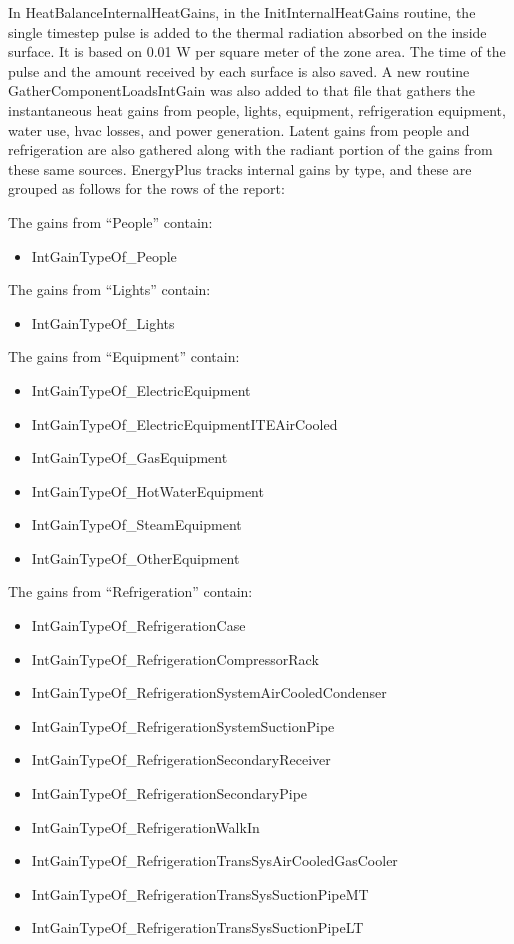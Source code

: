In HeatBalanceInternalHeatGains, in the InitInternalHeatGains routine, the single timestep pulse is added to the thermal radiation absorbed on the inside surface. It is based on 0.01 W per square meter of the zone area. The time of the pulse and the amount received by each surface is also saved. A new routine GatherComponentLoadsIntGain was also added to that file that gathers the instantaneous heat gains from people, lights, equipment, refrigeration equipment, water use, hvac losses, and power generation. Latent gains from people and refrigeration are also gathered along with the radiant portion of the gains from these same sources. EnergyPlus tracks internal gains by type, and these are grouped as follows for the rows of the report:

The gains from ``People'' contain:

\begin{itemize}
\tightlist
\item
  IntGainTypeOf\_People
\end{itemize}

The gains from ``Lights'' contain:

\begin{itemize}
\tightlist
\item
  IntGainTypeOf\_Lights
\end{itemize}

The gains from ``Equipment'' contain:

\begin{itemize}
\item
  IntGainTypeOf\_ElectricEquipment
\item
  IntGainTypeOf\_ElectricEquipmentITEAirCooled
\item
  IntGainTypeOf\_GasEquipment
\item
  IntGainTypeOf\_HotWaterEquipment
\item
  IntGainTypeOf\_SteamEquipment
\item
  IntGainTypeOf\_OtherEquipment
\end{itemize}

The gains from ``Refrigeration'' contain:

\begin{itemize}
\item
  IntGainTypeOf\_RefrigerationCase
\item
  IntGainTypeOf\_RefrigerationCompressorRack
\item
  IntGainTypeOf\_RefrigerationSystemAirCooledCondenser
\item
  IntGainTypeOf\_RefrigerationSystemSuctionPipe
\item
  IntGainTypeOf\_RefrigerationSecondaryReceiver
\item
  IntGainTypeOf\_RefrigerationSecondaryPipe
\item
  IntGainTypeOf\_RefrigerationWalkIn
\item
  IntGainTypeOf\_RefrigerationTransSysAirCooledGasCooler
\item
  IntGainTypeOf\_RefrigerationTransSysSuctionPipeMT
\item
  IntGainTypeOf\_RefrigerationTransSysSuctionPipeLT
\end{itemize}

